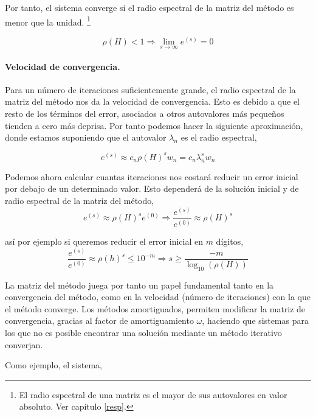 Por tanto, el sistema converge si el radio espectral de la matriz del método es menor que la unidad. \footnote{El radio espectral de una matriz es el mayor de sus autovalores en valor absoluto. Ver capítulo \ref{resp}.}

\begin{equation*}
\rho(H)<1 \Rightarrow \lim_{s\rightarrow \infty}e^{(s)}=0
\end{equation*}

\paragraph{Velocidad de convergencia.} Para un número de iteraciones suficientemente grande, el radio espectral de la matriz del método nos da la velocidad de convergencia. Esto es debido a que el resto de los términos del error, asociados a otros autovalores más pequeños tienden a cero más  deprisa. Por tanto podemos hacer la siguiente aproximación, donde estamos suponiendo que el autovalor $\lambda_n$ es el radio espectral,

\begin{equation*}
e^{(s)}\approx c_n \rho(H)^s w_n= c_n \lambda_n^s w_n
\end{equation*}

Podemos ahora calcular cuantas iteraciones nos costará reducir un error inicial por debajo de un determinado valor. Esto dependerá de la solución inicial y de radio espectral de la matriz del método,
\begin{equation*}
e^{(s)}\approx  \rho(H)^s e^{(0)} \Rightarrow \frac{e^{(s)}}{e^{(0)}} \approx \rho(H)^s
\end{equation*}

así por ejemplo si queremos reducir el error inicial en $m$ dígitos,
\begin{equation*}
\frac{e^{(s)}}{e^{(0)}} \approx \rho(h)^s \leq 10^{-m} \Rightarrow s \geq \frac{-m}{\log_{10}\left(\rho(H)\right)}
\end{equation*}

La matriz del método juega por tanto un papel fundamental tanto en la convergencia del método, como en la velocidad (número de iteraciones) con la que el método converge. Los métodos amortiguados, permiten modificar la matriz de convergencia, gracias al factor de amortiguamiento $\omega$, haciendo que sistemas para los que no es posible encontrar una solución mediante un método iterativo converjan.

Como ejemplo, el sistema,

